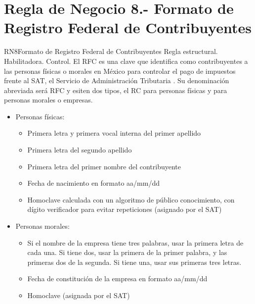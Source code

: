 \section{Regla de Negocio 8.- Formato de Registro Federal de Contribuyentes}

\begin{BussinesRule}{RN8}{Formato de Registro Federal de Contribuyentes }
	\BRitem[Tipo:] Regla estructural. 
	\BRitem[Clase:] Habilitadora. 
	\BRitem[Nivel:] Control. %
	\BRitem[Descripción:]El RFC es una clave que identifica como contribuyentes a las personas físicas o morales en México para controlar el pago de impuestos frente al SAT, el Servicio de Administración Tributaria \cite{RFC}. Su denominación abreviada será RFC y esiten dos tipos, el RC para personas físicas y para personas morales o empresas.
	\begin{itemize}
	            \item Personas físicas:
	            \begin{itemize}
	                \item Primera letra y primera vocal interna del primer apellido
                    \item Primera letra del segundo apellido
                    \item Primera letra del primer nombre del contribuyente
                    \item Fecha de nacimiento en formato aa/mm/dd
                    \item Homoclave calculada con un algoritmo de público conocimiento, con dígito verificador para evitar repeticiones (asignado por el SAT)
	            \end{itemize}
	            \item Personas morales:
	            \begin{itemize}
	                \item Si el nombre de la empresa tiene tres palabras, usar la primera letra de cada una. Si tiene dos, usar la primera de la primer palabra, y las primeras dos de la segunda. Si tiene una, usar sus primeras tres letras.
                \item Fecha de constitución de la empresa en formato aa/mm/dd
                \item Homoclave (asignada por el SAT)
	            \end{itemize}
	        \end{itemize}


\end{BussinesRule}
